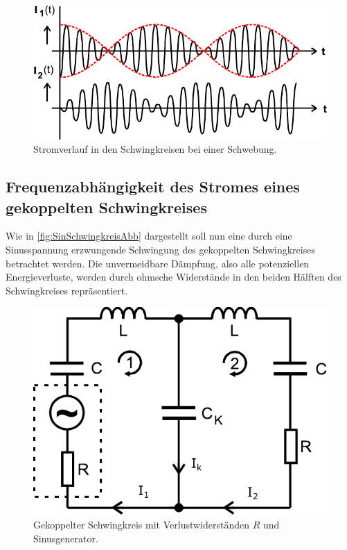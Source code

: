 \begin{figure}[H]
    \centering
    \includegraphics{SchwebungAbb.pdf}
    \caption{Stromverlauf in den Schwingkreisen bei einer Schwebung\cite{ap04}.}
    \label{fig:schwebung}
\end{figure}

\subsection{Frequenzabhängigkeit des Stromes eines gekoppelten Schwingkreises}

Wie in \autoref{fig:SinSchwingkreisAbb} dargestellt soll nun eine durch eine Sinusspannung erzwungende Schwingung des gekoppelten Schwingkreises betrachtet werden.
Die unvermeidbare Dämpfung, also alle potenziellen Energieverluste, werden durch ohmsche Widerstände in den beiden Hälften des Schwingkreises repräsentiert.

\begin{figure}
    \centering
    \includegraphics{SinSchwingkreisAbb.pdf}
    \caption{Gekoppelter Schwingkreis mit Verlustwiderständen $R$ und Sinusgenerator\cite{ap04}.}
    \label{fig:SinSchwingkreisAbb}
\end{figure}

